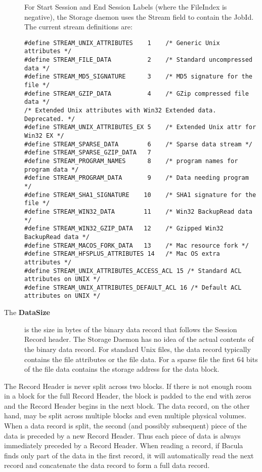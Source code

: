 \begin{description}
For Start Session and End Session Labels (where the FileIndex is negative),
the Storage daemon uses the Stream field to contain the JobId.  The current
stream definitions are:

\footnotesize
\begin{verbatim}
#define STREAM_UNIX_ATTRIBUTES    1    /* Generic Unix attributes */
#define STREAM_FILE_DATA          2    /* Standard uncompressed data */
#define STREAM_MD5_SIGNATURE      3    /* MD5 signature for the file */
#define STREAM_GZIP_DATA          4    /* GZip compressed file data */
/* Extended Unix attributes with Win32 Extended data.  Deprecated. */
#define STREAM_UNIX_ATTRIBUTES_EX 5    /* Extended Unix attr for Win32 EX */
#define STREAM_SPARSE_DATA        6    /* Sparse data stream */
#define STREAM_SPARSE_GZIP_DATA   7
#define STREAM_PROGRAM_NAMES      8    /* program names for program data */
#define STREAM_PROGRAM_DATA       9    /* Data needing program */
#define STREAM_SHA1_SIGNATURE    10    /* SHA1 signature for the file */
#define STREAM_WIN32_DATA        11    /* Win32 BackupRead data */
#define STREAM_WIN32_GZIP_DATA   12    /* Gzipped Win32 BackupRead data */
#define STREAM_MACOS_FORK_DATA   13    /* Mac resource fork */
#define STREAM_HFSPLUS_ATTRIBUTES 14   /* Mac OS extra attributes */
#define STREAM_UNIX_ATTRIBUTES_ACCESS_ACL 15 /* Standard ACL attributes on UNIX */
#define STREAM_UNIX_ATTRIBUTES_DEFAULT_ACL 16 /* Default ACL attributes on UNIX */
\end{verbatim}
\normalsize

\item [The {\bf DataSize} ]
   is the size in bytes of the binary data  record that follows the Session
Record header. The Storage Daemon  has no idea of the actual contents of the
binary data record. For  standard Unix files, the data record typically
contains the file  attributes or the file data. For a sparse file  the first
64 bits of the file data contains the storage  address for the data block.
\end{description}

The Record Header is never split across two blocks. If there is not enough
room in a block for the full Record Header, the block is padded to the end
with zeros and the Record Header begins in the next block. The data record, on
the other hand, may be split across multiple blocks and even multiple physical
volumes. When a data record is split, the second (and possibly subsequent)
piece of the data is preceded by a new Record Header. Thus each piece of data
is always immediately preceded by a Record Header. When reading a record, if
Bacula finds only part of the data in the first record, it will automatically
read the next record and concatenate the data record to form a full data
record.

